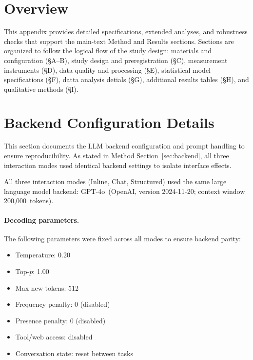 \documentclass[sigconf]{acmart}
\newcommand{\ModelName}{GPT-4o} %
\newcommand{\ModelProvider}{OpenAI}      %
\newcommand{\ModelVersion}{2024-11-20}         %
\newcommand{\CtxWindow}{200{,}000}          %
\newcommand{\Temp}{0.20}
\newcommand{\TopP}{1.00}
\newcommand{\MaxNew}{512}
\begin{document}


\newpage

\appendix
\section{Overview}
This appendix provides detailed specifications, extended analyses, and robustness checks that support the main-text Method and Results sections. Sections are organized to follow the logical flow of the study design: materials and configuration (§A--B), study design and preregistration (§C), measurement instruments (§D), data quality and processing (§E), statistical model specifications (§F), datta analysis detials (§G), additional results tables (§H), and qualitative methods (§I).

\section{Backend Configuration Details}
\label{app:backend}

This section documents the LLM backend configuration and prompt handling to ensure reproducibility. As stated in Method Section~\ref{sec:backend}, all three interaction modes used identical backend settings to isolate interface effects.

All three interaction modes (Inline, Chat, Structured) used the same large language model backend: \ModelName\ (\ModelProvider, version \ModelVersion; context window \CtxWindow\ tokens). 

\paragraph{Decoding parameters.}
The following parameters were fixed across all modes to ensure backend parity:
\begin{itemize}[leftmargin=1.25em]
  \item Temperature: \Temp
  \item Top-$p$: \TopP
  \item Max new tokens: \MaxNew
  \item Frequency penalty: 0 (disabled)
  \item Presence penalty: 0 (disabled)
  \item Tool/web access: disabled
  \item Conversation state: reset between tasks
\end{itemize}
\end{document}
